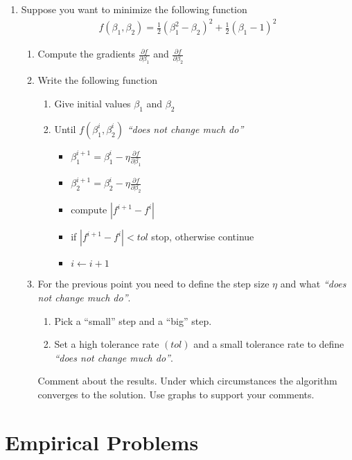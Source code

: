 \documentclass[12pt,onecolumn]{article}
\begin{document}
\begin{enumerate}
  \item  Suppose you want to minimize the following function 
  \begin{align}
  f(\beta_1,\beta_2)=\frac{1}{2}(\beta_1^2-\beta_2)^2+ \frac{1}{2}(\beta_1-1)^2
  \end{align}
  \begin{enumerate}
    \item Compute the gradients $\frac{\partial f}{\partial \beta_1}$ and $\frac{\partial f}{\partial \beta_2}$
    \item Write the following function
    \begin{enumerate}
      \item Give initial values $\beta_1$ and $\beta_2$
      \item Until $f(\beta^i_1,\beta^i_2)$ {\it ``does not change much do''}
      \begin{itemize}
       \item $\beta_1^{i+1} = \beta_1^{i} - \eta \frac{\partial f}{\partial \beta_1}$
       \item $\beta_2^{i+1} = \beta_2^{i} - \eta \frac{\partial f}{\partial \beta_2}$
       \item compute $|f^{i+1}-f^{i}|$
       \item if $|f^{i+1}-f^{i}|<tol$ stop, otherwise continue
       \item $i \leftarrow i+1$
      \end{itemize}
      \end{enumerate}
      \item For the previous point you need to define the step size $\eta$ and what {\it ``does not change much do''}.
      \begin{enumerate}
        \item Pick a ``small'' step and a ``big'' step. 
        \item Set a high tolerance rate $(tol)$ and a small tolerance rate to define {\it ``does not change much do''}. 
      \end{enumerate}
       Comment about the results. Under which circumstances the algorithm converges to the solution. Use graphs to support your comments.
\end{enumerate}

\end{enumerate}



\section{Empirical Problems}
\end{document}
